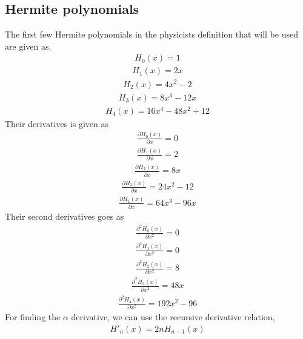\documentclass[11pt]{article}
\begin{document}
\subsection{Hermite polynomials}
The first few Hermite polynomials in the physicists definition that will be used are given as,
\begin{align*}
	H_0(x) = 1
\end{align*}
\begin{align*}
	H_1(x) = 2x
\end{align*}
\begin{align*}
	H_2(x) = 4x^2 - 2
\end{align*}
\begin{align*}
	H_3(x) = 8x^3 - 12x
\end{align*}
\begin{align*}
	H_4(x) = 16x^4 - 48x^2 + 12
\end{align*}
Their derivatives is given as
\begin{align*}
	\frac{\partial H_0(x)}{\partial x} = 0
\end{align*}
\begin{align*}
	\frac{\partial H_1(x)}{\partial x} = 2
\end{align*}
\begin{align*}
	\frac{\partial H_2(x)}{\partial x} = 8x
\end{align*}
\begin{align*}
	\frac{\partial H_3(x)}{\partial x} = 24x^2 - 12
\end{align*}
\begin{align*}
	\frac{\partial H_4(x)}{\partial x} = 64x^3 - 96x
\end{align*}
Their second derivatives goes as
\begin{align*}
	\frac{\partial^2 H_0(x)}{\partial x^2} = 0
\end{align*}
\begin{align*}
	\frac{\partial^2 H_1(x)}{\partial x^2} = 0
\end{align*}
\begin{align*}
	\frac{\partial^2 H_2(x)}{\partial x^2} = 8
\end{align*}
\begin{align*}
	\frac{\partial^2 H_3(x)}{\partial x^2} = 48x
\end{align*}
\begin{align*}
	\frac{\partial^2 H_4(x)}{\partial x^2} = 192x^2 - 96
\end{align*}
For finding the $\alpha$ derivative, we can use the recursive derivative relation,
\begin{align}
	H'_n(x) = 2nH_{n-1}(x)
	\label{eq:hermite-recursive-relation}
\end{align}
\end{document}
